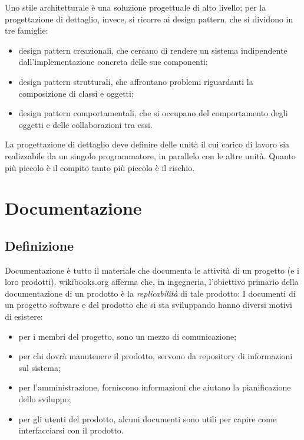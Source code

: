 \documentclass[a4paper]{article}
\begin{document}
		
Uno stile architetturale è una soluzione progettuale di alto livello; per la progettazione di dettaglio, invece, si ricorre ai design pattern, che si dividono in tre famiglie:
		
	\begin{itemize}
		
			
	\item design pattern creazionali, che cercano di rendere un sistema indipendente dall'implementazione concreta delle sue componenti;
			
	\item design pattern strutturali, che affrontano problemi riguardanti la composizione di classi e oggetti;
			
	\item design pattern comportamentali, che si occupano del comportamento degli oggetti e delle collaborazioni tra essi.
		
	\end{itemize}

		
La progettazione di dettaglio deve definire delle unità il cui carico di lavoro sia realizzabile da un singolo programmatore, in parallelo con le altre unità. Quanto più piccolo è il compito tanto più piccolo è il rischio.
	


		
	\section{Documentazione}


		
	\subsection{Definizione}

		
Documentazione è tutto il materiale che documenta le attività di un progetto (e i loro prodotti). wikibooks.org afferma che, in ingegneria, l'obiettivo primario della documentazione di un prodotto è la \emph{replicabilità} di tale prodotto:  I documenti di un progetto software e del prodotto che si sta sviluppando hanno diversi motivi di esistere:
		
	\begin{itemize}
		
			
	\item per i membri del progetto, sono un mezzo di comunicazione;
			
	\item per chi dovrà manutenere il prodotto, servono da repository di informazioni sul sistema;
			
	\item per l'amministrazione, forniscono informazioni che aiutano la pianificazione dello sviluppo;
			
	\item per gli utenti del prodotto, alcuni documenti sono utili per capire come interfacciarsi con il prodotto.
		
	\end{itemize}
\end{document}
